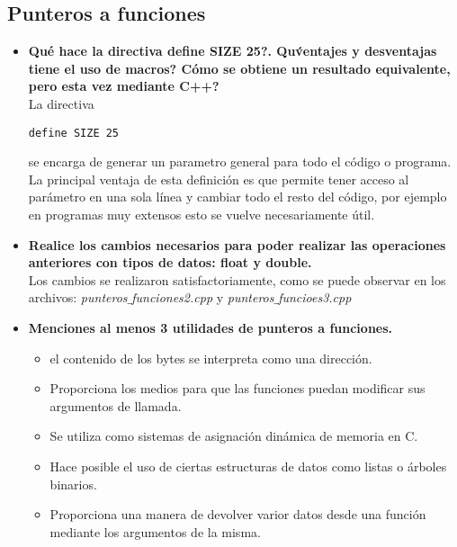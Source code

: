 \documentclass{article}
\begin{document}
\subsection{Punteros a funciones}
\begin{itemize}
\item \textbf{Qu\' e hace la directiva define SIZE 25?. Qu\'  ventajes y desventajas tiene el uso de macros? C\' omo se
obtiene un resultado equivalente, pero esta vez mediante C++?}\\

La directiva \begin{verbatim}
define SIZE 25
\end{verbatim}
se encarga de generar un parametro general para todo el c\' odigo o programa. La principal ventaja de esta definici\' on es que permite tener acceso al par\' ametro en una sola l\' inea y cambiar todo el resto del c\' odigo, por ejemplo en programas muy extensos esto se vuelve necesariamente \' util.

\item \textbf{Realice los cambios necesarios para poder realizar las operaciones anteriores con tipos de datos: float y double.}\\
Los cambios se realizaron satisfactoriamente, como se puede observar en los archivos: \textit{punteros$\_$funciones2.cpp} y \textit{punteros$\_$funcioes3.cpp}

\item \textbf{ Menciones al menos 3 utilidades de punteros a funciones.}\\
\begin{itemize}
\item el contenido de los bytes se interpreta como una direcci\' on.
\item Proporciona los medios para que las funciones puedan modificar sus argumentos de llamada.
\item Se utiliza como sistemas de asignaci\' on din\' amica de memoria en C.
\item Hace posible el uso de ciertas estructuras de datos como listas o \' arboles binarios.
\item Proporciona una manera de devolver varior datos desde una funci\' on mediante los argumentos de la misma.
\end{itemize}

\end{itemize}





\end{document}
